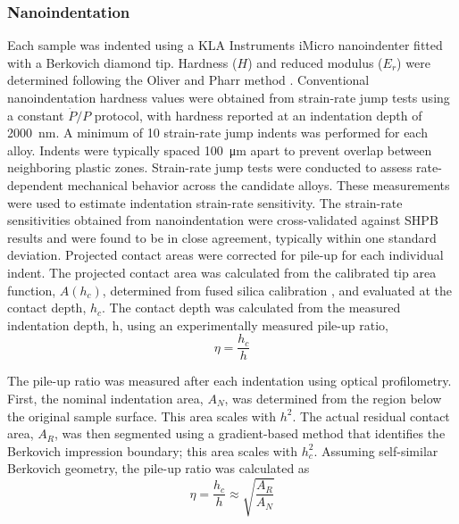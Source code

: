 \subsubsection{Nanoindentation}



Each sample was indented using a KLA Instruments iMicro nanoindenter fitted with a Berkovich diamond tip. Hardness ($H$) and reduced modulus ($E_r$) were determined following the Oliver and Pharr method \cite{Oliver1992}. Conventional nanoindentation hardness values were obtained from strain-rate jump tests using a constant $\dot{P}\!/P$ protocol, with hardness reported at an indentation depth of \SI{2000}{\nano\meter}. A minimum of 10 strain-rate jump indents was performed for each alloy. Indents were typically spaced \SI{100}{\micro\meter} apart to prevent overlap between neighboring plastic zones.
Strain-rate jump tests were conducted to assess rate-dependent mechanical behavior across the candidate alloys. These measurements were used to estimate indentation strain-rate sensitivity. The strain-rate sensitivities obtained from nanoindentation were cross-validated against SHPB results and were found to be in close agreement, typically within one standard deviation.
Projected contact areas were corrected for pile-up for each individual indent. The projected contact area was calculated from the calibrated tip area function, $A(h_c)$, determined from fused silica calibration \cite{Oliver1992}, and evaluated at the contact depth, $h_c$. The contact depth was calculated from the measured indentation depth, h, using an experimentally measured pile-up ratio,
\[
\eta = \frac{h_c}{h}
\]

The pile-up ratio was measured after each indentation using optical profilometry. First, the nominal indentation area, $A_N$, was determined from the region below the original sample surface. This area scales with $h^2$. The actual residual contact area, $A_R$, was then segmented using a gradient-based method that identifies the Berkovich impression boundary; this area scales with $h_c^2$. Assuming self-similar Berkovich geometry, the pile-up ratio was calculated as
\[
\eta = \frac{h_c}{h} \approx \sqrt{\frac{A_R}{A_N}}
\]

